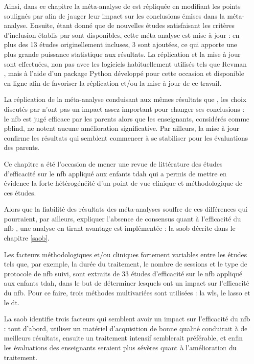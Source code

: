 Ainsi, dans ce chapitre la méta-analyse de \citet{Cortese2016} est répliquée en modifiant les points soulignés par \citet{Micoulaud2016}
afin de jauger leur impact sur les conclusions émises dans la méta-analyse. Ensuite, étant donné que de nouvelles études satisfaisant les critères d'inclusion
établis par \citet{Cortese2016} sont disponibles, cette méta-analyse est mise à jour : en plus des 13 études originellement incluses, 3
sont ajoutées, ce qui apporte une plus grande puissance statistique aux résultats. La réplication et la mise à jour sont effectuées, non pas avec les logiciels 
habituellement utilisés tels que Revman \citep{Revman}, mais à l'aide d'un package Python développé pour cette occasion et disponible en ligne afin de favoriser 
la réplication et/ou la mise à jour de ce travail. 

La réplication de la méta-analyse conduisant aux mêmes résultats que \citet{Cortese2016}, les choix discutés par \citet{Micoulaud2016} n'ont pas un impact assez
important pour changer ses conclusions : le \gls{nfb} est jugé efficace par les parents alors que les enseignants, considérés comme \gls{pblind}, ne notent aucune
amélioration significative. Par ailleurs, la mise à jour confirme les résultats qui semblent commencer à se stabiliser pour les évaluations des parents.

Ce chapitre a été l'occasion de mener une revue de littérature des études d'efficacité sur le \gls{nfb} appliqué aux enfants \gls{tdah} 
qui a permis de mettre en évidence la forte hétérogénéité d'un point de vue clinique et méthodologique de ces études. 

Alors que la fiabilité des résultats des méta-analyses souffre de ces différences qui pourraient, par ailleurs, expliquer l'absence de consensus quant 
à l'efficacité du \gls{nfb} \citep{Alkoby2017}, une analyse en tirant avantage est implémentée : la \gls{saob} décrite dans le chapitre \ref{saob}. 

Les facteurs méthodologiques et/ou cliniques fortement variables entre les études tels que, par exemple, la durée du traitement, le nombre de sessions et le type 
de protocole de \gls{nfb} suivi, sont extraits de 33 études d'efficacité sur le \gls{nfb} appliqué aux enfants \gls{tdah}, dans le but de déterminer lesquels 
ont un impact sur l'efficacité du \gls{nfb}. Pour ce faire, trois méthodes multivariées sont utilisées : la \gls{wls}, le \gls{lasso} et le \gls{dt}. 

La \gls{saob} identifie trois facteurs qui semblent avoir un impact sur l'efficacité du \gls{nfb} : tout d'abord, utiliser un matériel d'acquisition de bonne 
qualité conduirait à de meilleurs résultats, ensuite un traitement intensif semblerait préférable, et enfin les évaluations des enseignants seraient plus
sévères quant à l'amélioration du traitement. 

